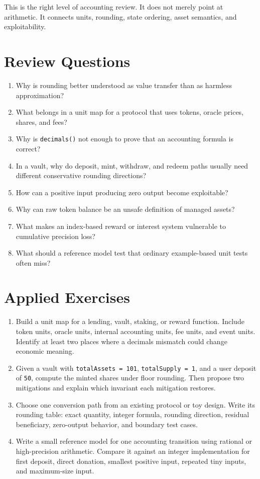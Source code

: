 This is the right level of accounting review. It does not merely point at arithmetic. It connects units, rounding, state ordering, asset semantics, and exploitability.

\section*{Review Questions}

\begin{enumerate}
\item Why is rounding better understood as value transfer than as harmless approximation?
\item What belongs in a unit map for a protocol that uses tokens, oracle prices, shares, and fees?
\item Why is \texttt{decimals()} not enough to prove that an accounting formula is correct?
\item In a vault, why do deposit, mint, withdraw, and redeem paths usually need different conservative rounding directions?
\item How can a positive input producing zero output become exploitable?
\item Why can raw token balance be an unsafe definition of managed assets?
\item What makes an index-based reward or interest system vulnerable to cumulative precision loss?
\item What should a reference model test that ordinary example-based unit tests often miss?
\end{enumerate}

\section*{Applied Exercises}

\begin{enumerate}
\item Build a unit map for a lending, vault, staking, or reward function. Include token units, oracle units, internal accounting units, fee units, and event units. Identify at least two places where a decimals mismatch could change economic meaning.

\item Given a vault with \texttt{totalAssets = 101}, \texttt{totalSupply = 1}, and a user deposit of \texttt{50}, compute the minted shares under floor rounding. Then propose two mitigations and explain which invariant each mitigation restores.

\item Choose one conversion path from an existing protocol or toy design. Write its rounding table: exact quantity, integer formula, rounding direction, residual beneficiary, zero-output behavior, and boundary test cases.

\item Write a small reference model for one accounting transition using rational or high-precision arithmetic. Compare it against an integer implementation for first deposit, direct donation, smallest positive input, repeated tiny inputs, and maximum-size input.
\end{enumerate}
